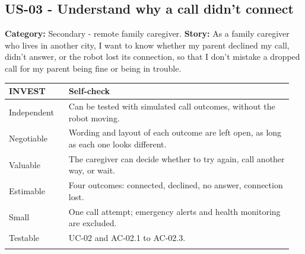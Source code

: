 \documentclass[12pt,letterpaper]{article}
\begin{document}
\par\medskip
\begin{minipage}{\linewidth}
\subsection*{US-03 - Understand why a call didn't connect}

\textbf{Category:} Secondary - remote family caregiver. \textbf{Story:} As a family caregiver who lives in another city, I want to know whether my parent declined my call, didn't answer, or the robot lost its connection, so that I don't mistake a dropped call for my parent being fine or being in trouble.

\begingroup\small

\begin{tabular}{@{}>{\RaggedRight\arraybackslash}p{0.2\linewidth}>{\RaggedRight\arraybackslash}p{0.75\linewidth}@{}}

\toprule\textbf{INVEST} & \textbf{Self-check}\\\midrule

Independent & Can be tested with simulated call outcomes, without the robot moving. \\ \addlinespace[3pt]

Negotiable & Wording and layout of each outcome are left open, as long as each one looks different. \\ \addlinespace[3pt]

Valuable & The caregiver can decide whether to try again, call another way, or wait. \\ \addlinespace[3pt]

Estimable & Four outcomes: connected, declined, no answer, connection lost. \\ \addlinespace[3pt]

Small & One call attempt; emergency alerts and health monitoring are excluded. \\ \addlinespace[3pt]

Testable & UC-02 and AC-02.1 to AC-02.3. \\ \addlinespace[3pt]

\bottomrule
\end{tabular}

\endgroup
\end{minipage}
\par\medskip
\end{document}

